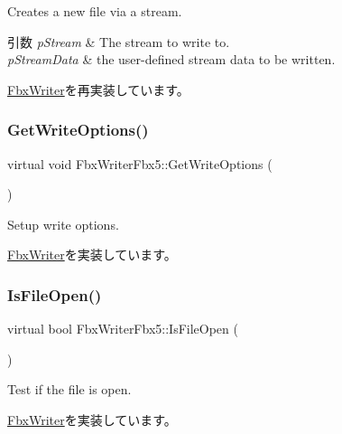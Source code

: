 Creates a new file via a stream. 
\begin{DoxyParams}{引数}
{\em p\+Stream} & The stream to write to. \\
\hline
{\em p\+Stream\+Data} & the user-\/defined stream data to be written. \\
\hline
\end{DoxyParams}


\hyperlink{class_fbx_writer_a9b64b6230b05e64a83b78b36d1667da7}{Fbx\+Writer}を再実装しています。

\mbox{\label{class_fbx_writer_fbx5_ad86d4ec0c944e5c552286fdcbd7ff86d}} 
\subsubsection{\texorpdfstring{Get\+Write\+Options()}{GetWriteOptions()}}
{\footnotesize\ttfamily virtual void Fbx\+Writer\+Fbx5\+::\+Get\+Write\+Options (\begin{DoxyParamCaption}{ }\end{DoxyParamCaption})\hspace{0.3cm}{\ttfamily [virtual]}}

Setup write options. 

\hyperlink{class_fbx_writer_ad237f5cd183ae29f744aee32b7aa5525}{Fbx\+Writer}を実装しています。

\mbox{\label{class_fbx_writer_fbx5_abe979bfdd626bd8b222a8385e6529a47}} 
\subsubsection{\texorpdfstring{Is\+File\+Open()}{IsFileOpen()}}
{\footnotesize\ttfamily virtual bool Fbx\+Writer\+Fbx5\+::\+Is\+File\+Open (\begin{DoxyParamCaption}{ }\end{DoxyParamCaption})\hspace{0.3cm}{\ttfamily [virtual]}}

Test if the file is open. 

\hyperlink{class_fbx_writer_ab70be3aaebd304af11cdce5e225cce68}{Fbx\+Writer}を実装しています。

